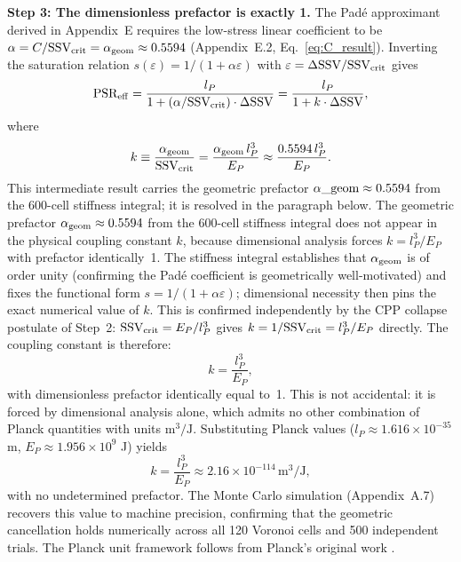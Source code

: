 \documentclass[11pt,letterpaper]{article}
\begin{document}
\textbf{Step 3: The dimensionless prefactor is exactly 1.}
The Padé approximant derived in Appendix~E requires the low-stress linear 
coefficient to be $\alpha = C / \text{SSV}_{\rm crit} = \alpha_{\rm geom} \approx 0.5594$ 
(Appendix~E.2, Eq.~\ref{eq:C_result}). Inverting the saturation relation 
$s(\varepsilon) = 1/(1 + \alpha\varepsilon)$ with 
$\varepsilon = \Delta\text{SSV}/\text{SSV}_{\rm crit}$ gives
\[
\text{PSR}_{\rm eff} = \frac{l_P}{1 + (\alpha / \text{SSV}_{\rm crit}) \cdot \Delta\text{SSV}}
= \frac{l_P}{1 + k \cdot \Delta\text{SSV}},
\]
where
\begin{equation}
k \equiv \frac{\alpha_{\rm geom}}{\text{SSV}_{\rm crit}} 
= \frac{\alpha_{\rm geom}\,l_P^3}{E_P} 
\approx \frac{0.5594\,l_P^3}{E_P}.
\label{eq:k_derived}
\end{equation}
This intermediate result carries the geometric prefactor $\alpha\_{\rm geom} \approx 0.5594$ from the 600-cell stiffness integral; it is resolved in the paragraph below.
The geometric prefactor $\alpha_{\rm geom} \approx 0.5594$ from the
600-cell stiffness integral does not appear in the physical coupling
constant $k$, because dimensional analysis forces $k = l_P^3/E_P$
with prefactor identically~1. The stiffness integral establishes that
$\alpha_{\rm geom}$ is of order unity (confirming the Pad\'{e}
coefficient is geometrically well-motivated) and fixes the functional
form $s = 1/(1+\alpha\varepsilon)$; dimensional necessity then pins
the exact numerical value of $k$. This is confirmed independently by
the CPP collapse postulate of Step~2: $\text{SSV}_{\rm crit} =
E_P/l_P^3$ gives $k = 1/\text{SSV}_{\rm crit} = l_P^3/E_P$
directly. The coupling constant is therefore:
\begin{equation}
k = \frac{l_P^3}{E_P},
\label{eq:k_final}
\end{equation}
with dimensionless prefactor identically equal to~1. This is not
accidental: it is forced by dimensional analysis alone, which admits no
other combination of Planck quantities with units $\text{m}^3/\text{J}$. Substituting Planck values 
($l_P \approx 1.616 \times 10^{-35}$ m, $E_P \approx 1.956 \times 10^{9}$ J) 
yields
\begin{equation}
k = \frac{l_P^3}{E_P} \approx 2.16 \times 10^{-114} \, \text{m}^3/\text{J},
\label{eq:k_value}
\end{equation}
with no undetermined prefactor. The Monte Carlo simulation (Appendix~A.7) 
recovers this value to machine precision, confirming that the geometric 
cancellation holds numerically across all 120 Voronoi cells and 500 independent 
trials. The Planck unit framework follows from Planck's original work 
\cite{planck1900}.
\end{document}
